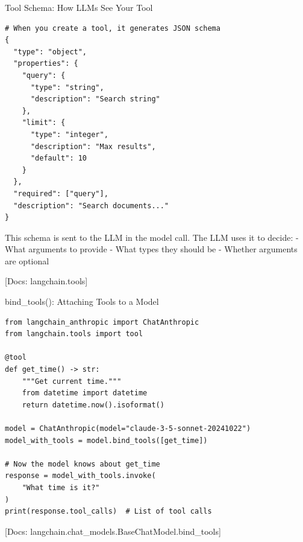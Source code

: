 \documentclass[aspectratio=169,11pt]{beamer}
\newcommand{\docref}[1]{{\scriptsize\color{docgray}[Docs: #1]}}
\begin{document}
\begin{frame}[fragile]{Tool Schema: How LLMs See Your Tool}
\begin{codebox}
\begin{lstlisting}
# When you create a tool, it generates JSON schema
{
  "type": "object",
  "properties": {
    "query": {
      "type": "string",
      "description": "Search string"
    },
    "limit": {
      "type": "integer",
      "description": "Max results",
      "default": 10
    }
  },
  "required": ["query"],
  "description": "Search documents..."
}
\end{lstlisting}
\end{codebox}

This schema is sent to the LLM in the model call. The LLM uses it to decide:
- What arguments to provide
- What types they should be
- Whether arguments are optional

\textcolor{docgray}{\docref{langchain.tools}}
\end{frame}

\begin{frame}[fragile]{bind\_tools(): Attaching Tools to a Model}
\begin{codebox}
\begin{lstlisting}
from langchain_anthropic import ChatAnthropic
from langchain.tools import tool

@tool
def get_time() -> str:
    """Get current time."""
    from datetime import datetime
    return datetime.now().isoformat()

model = ChatAnthropic(model="claude-3-5-sonnet-20241022")
model_with_tools = model.bind_tools([get_time])

# Now the model knows about get_time
response = model_with_tools.invoke(
    "What time is it?"
)
print(response.tool_calls)  # List of tool calls
\end{lstlisting}
\end{codebox}

\textcolor{docgray}{\docref{langchain.chat\_models.BaseChatModel.bind\_tools}}
\end{frame}
\end{document}
